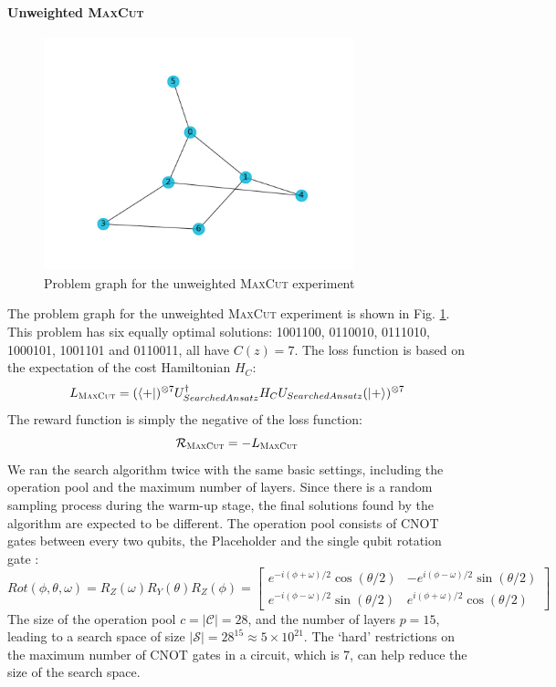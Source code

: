 \documentclass[a4paper,onecolumn,11pt]{quantumarticle}
\begin{document}
\paragraph{Unweighted \textsc{MaxCut}}
\begin{figure}[H]
  \centering
  \includegraphics[width=0.8\textwidth]{Figures/fig_max_cut_large_7q.pdf}
  \caption{Problem graph for the unweighted \textsc{MaxCut} experiment}
  \label{fig:max_cut_prob}
\end{figure}
The problem graph for the unweighted \textsc{MaxCut} experiment is shown in Fig. \ref{fig:max_cut_prob}. This problem has six equally optimal solutions: 1001100, 0110010, 0111010, 1000101, 1001101 and 0110011, all have $C(z)=7$. The loss function is based on the expectation of the cost Hamiltonian $H_C$:
\begin{equation}
    L_{\textsc{MaxCut}} = (\bra{+})^{\otimes 7}U_{SearchedAnsatz}^{\dagger} H_C U_{SearchedAnsatz}   (\ket{+})^{\otimes 7}
\end{equation}
The reward function is simply the negative of the loss function:
\begin{equation}
    \mathcal{R}_{\textsc{MaxCut}} = -L_{\textsc{MaxCut}}
\end{equation}
We ran the search algorithm twice with the same basic settings, including the operation pool and the maximum number of layers. Since there is a random sampling process during the warm-up stage, the final solutions found by the algorithm are expected to be different. The operation pool consists of CNOT gates between every two qubits, the Placeholder and the single qubit rotation gate \cite{nielsen00}:
\begin{equation}
Rot(\phi, \theta, \omega)=R_Z(\omega) R_Y(\theta) R_Z(\phi)=\left[\begin{array}{cc}
e^{-i(\phi+\omega) / 2} \cos (\theta / 2) & -e^{i(\phi-\omega) / 2} \sin (\theta / 2) \\
e^{-i(\phi-\omega) / 2} \sin (\theta / 2) & e^{i(\phi+\omega) / 2} \cos (\theta / 2)
\end{array}\right]
\end{equation}
The size of the operation pool $c = \vert \mathcal{C} \vert = 28$, and the number of layers $p = 15$, leading to a search space of size $\vert \mathcal{S} \vert = 28^{15} \approx 5 \times10^{21}$. The `hard' restrictions on the maximum number of CNOT gates in a circuit, which is 7,  can help reduce the size of the search space.
\end{document}

